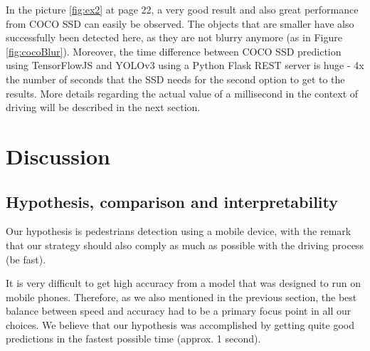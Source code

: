 \documentclass[runningheads,a4paper,11pt]{report}
\begin{document}
In the picture \ref{fig:ex2} at page 22, a very good result and also great performance from COCO SSD can easily be observed. The objects that are smaller have also successfully been detected here, as they are not blurry anymore (as in Figure \ref{fig:cocoBlur}). Moreover, the time difference between COCO SSD prediction using TensorFlowJS and YOLOv3 using a Python Flask REST server is huge - 4x the number of seconds that the SSD needs for the second option to get to the results. More details regarding the actual value of a millisecond in the context of driving will be described in the next section.


\section{Discussion}
\label{section:discussion}
 \subsection{Hypothesis, comparison and interpretability}
\label{subsection:results}

Our hypothesis is pedestrians detection using a mobile device, with the remark that our strategy should also comply as much as possible with the driving process (be fast).


It is very difficult to get high accuracy from a model that was designed to run on mobile phones. Therefore, as we also mentioned in the previous section, the best balance between speed and accuracy had to be a primary focus point in all our choices. We believe that our hypothesis was accomplished by getting quite good predictions in the fastest possible time (approx. 1 second).
\end{document}
